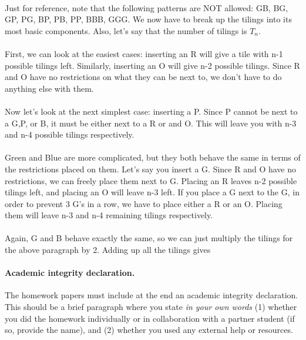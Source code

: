 \documentclass[11pt]{article}
\begin{document}
\begin{solution}
	\\
	Just for reference, note that the following patterns are NOT allowed: GB, BG, GP, PG, BP, PB, PP, BBB, GGG. We now have to break up the tilings into its most basic components. Also, let's say that the number of tilings is $T_n$. \\\\ First, we can look at the easiest cases: inserting an R will give a tile with n-1 possible tilings left. Similarly, inserting an O will give n-2 possible tilings. Since R and O have no restrictions on what they can be next to, we don't have to do anything else with them. \\\\ Now let's look at the next simplest case: inserting a P. Since P cannot be next to a G,P, or B, it must be either next to a R or and O. This will leave you with n-3 and n-4 possible tilings respectively. \\\\ Green and Blue are more complicated, but they both behave the same in terms of the restrictions placed on them. Let's say you insert a G. Since R and O have no restrictions, we can freely place them next to G. Placing an R leaves n-2 possible tilings left, and placing an O will leave n-3 left. If you place a G next to the G, in order to prevent 3 G's in a row, we have to place either a R or an O. Placing them will leave n-3 and n-4 remaining tilings respectively. \\\\ Again, G and B behave exactly the same, so we can just multiply the tilings for the above paragraph by 2. Adding up all the tilings gives
\end{solution}


\vskip 0.1in

\paragraph{Academic integrity declaration.}
The homework papers must include at the end an academic integrity declaration. This should be a brief paragraph where you state
\emph{in your own words}  (1) whether you did the homework individually or in collaboration with a partner student (if so, provide the name), 
and (2) whether you used any external help or resources. 
\end{document}
